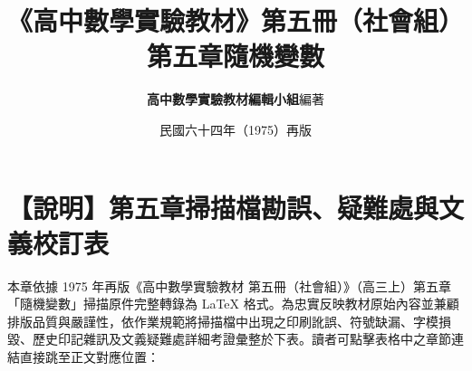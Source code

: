 \documentclass[a4paper,12pt,twoside]{article}
\title{\LARGE\textbf{《高中數學實驗教材》第五冊（社會組）}\\[0.5em] \Large\textbf{第五章\quad 隨機變數}}
\author{\textbf{高中數學實驗教材編輯小組}\quad 編著}
\date{民國六十四年（1975）再版}
\begin{document}
\maketitle
\thispagestyle{firstpage}

\section*{【說明】第五章掃描檔勘誤、疑難處與文義校訂表}
\label{sec:errata_notes_b5_ch5}
\label{sec:current_errata}

本章依據 1975 年再版《高中數學實驗教材 第五冊（社會組）》（高三上）第五章「隨機變數」掃描原件完整轉錄為 \LaTeX{} 格式。為忠實反映教材原始內容並兼顧排版品質與嚴謹性，依作業規範將掃描檔中出現之印刷訛誤、符號缺漏、字模損毀、歷史印記雜訊及文義疑難處詳細考證彙整於下表。讀者可點擊表格中之章節連結直接跳至正文對應位置：
\end{document}
